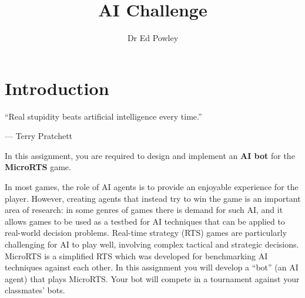 \documentclass{../../../fal_assignment}
\title{AI Challenge}
\author{Dr Ed Powley}
\begin{document}
\maketitle

\section*{Introduction}

\begin{marginquote}
``Real stupidity beats artificial intelligence every time.''

--- Terry Pratchett
\end{marginquote}

In this assignment, you are required to design and implement
an \textbf{AI bot} for the \textbf{MicroRTS} game.

In most games, the role of AI agents is to provide an enjoyable experience for the player.
However, creating agents that instead try to win the game is an important area of research:
in some genres of games there is demand for such AI,
and it allows games to be used as a testbed for AI techniques that can be applied to real-world decision problems.
Real-time strategy (RTS) games are particularly challenging for AI to play well,
involving complex tactical and strategic decisions.
MicroRTS is a simplified RTS which was developed for benchmarking AI techniques against each other.
In this assignment you will develop a ``bot'' (an AI agent) that plays MicroRTS.
Your bot will compete in a tournament against your classmates' bots.
\end{document}
